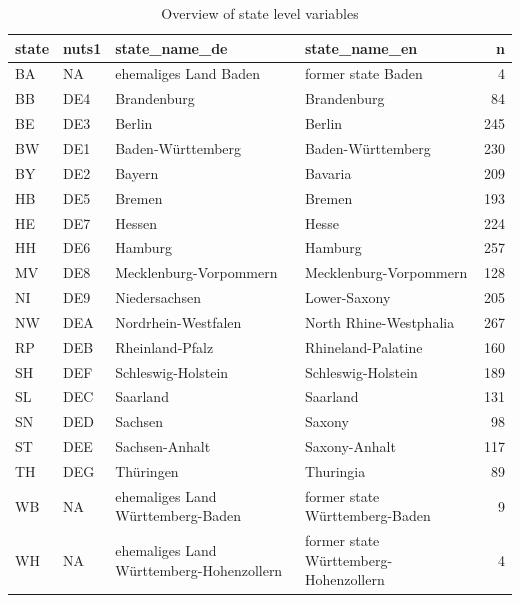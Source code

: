 \documentclass[
]{article}
\begin{document}
\begin{table}

\caption{\label{tab:state_variables_table}Overview of state level variables}
\centering
\begin{tabular}[t]{llllr}
\toprule
state & nuts1 & state\_name\_de & state\_name\_en & n\\
\midrule
BA & NA & ehemaliges Land Baden & former state Baden & 4\\
BB & DE4 & Brandenburg & Brandenburg & 84\\
BE & DE3 & Berlin & Berlin & 245\\
BW & DE1 & Baden-Württemberg & Baden-Württemberg & 230\\
BY & DE2 & Bayern & Bavaria & 209\\
\addlinespace
HB & DE5 & Bremen & Bremen & 193\\
HE & DE7 & Hessen & Hesse & 224\\
HH & DE6 & Hamburg & Hamburg & 257\\
MV & DE8 & Mecklenburg-Vorpommern & Mecklenburg-Vorpommern & 128\\
NI & DE9 & Niedersachsen & Lower-Saxony & 205\\
\addlinespace
NW & DEA & Nordrhein-Westfalen & North Rhine-Westphalia & 267\\
RP & DEB & Rheinland-Pfalz & Rhineland-Palatine & 160\\
SH & DEF & Schleswig-Holstein & Schleswig-Holstein & 189\\
SL & DEC & Saarland & Saarland & 131\\
SN & DED & Sachsen & Saxony & 98\\
\addlinespace
ST & DEE & Sachsen-Anhalt & Saxony-Anhalt & 117\\
TH & DEG & Thüringen & Thuringia & 89\\
WB & NA & ehemaliges Land Württemberg-Baden & former state Württemberg-Baden & 9\\
WH & NA & ehemaliges Land Württemberg-Hohenzollern & former state Württemberg-Hohenzollern & 4\\
\bottomrule
\end{tabular}
\end{table}
\end{document}
